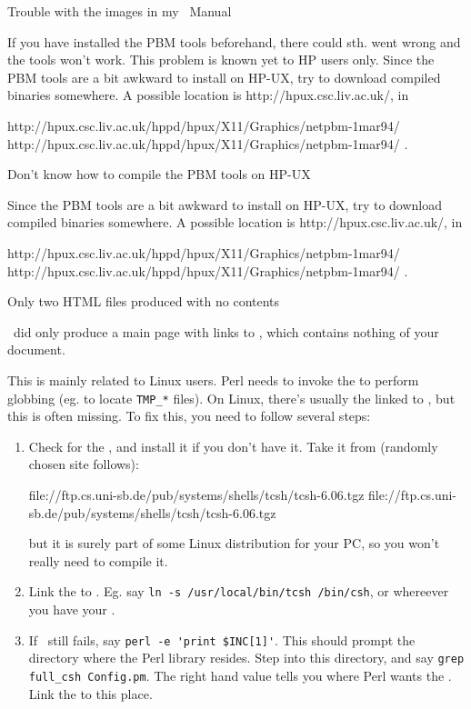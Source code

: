 \begin{htmllist}
\item [Trouble with the images in my \latextohtml\ Manual]

If you have installed the PBM tools beforehand, there could sth.
went wrong and the tools won't work.
This problem is known yet to HP users only.
Since the PBM tools are a bit awkward to install on HP-UX, try
to download compiled binaries somewhere.
A possible location is http://hpux.csc.liv.ac.uk/, in

\htmladdnormallink
{http://hpux.csc.liv.ac.uk/hppd/hpux/X11/Graphics/netpbm-1mar94/}
{http://hpux.csc.liv.ac.uk/hppd/hpux/X11/Graphics/netpbm-1mar94/}
.


\item [Don't know how to compile the PBM tools on HP-UX]

Since the PBM tools are a bit awkward to install on HP-UX, try
to download compiled binaries somewhere.
A possible location is http://hpux.csc.liv.ac.uk/, in

\htmladdnormallink
{http://hpux.csc.liv.ac.uk/hppd/hpux/X11/Graphics/netpbm-1mar94/}
{http://hpux.csc.liv.ac.uk/hppd/hpux/X11/Graphics/netpbm-1mar94/}
.


\item [Only two HTML files produced with no contents]

\latextohtml\ did only produce a main page with links to
, which contains nothing of your document.

This is mainly related to Linux users.
Perl needs to invoke the  to perform globbing
(eg. to locate \verb/TMP_*/ files).
On Linux, there's usually the  linked to ,
but this is often missing.
To fix this, you need to follow several steps:

\begin{enumerate}
\item Check for the , and install it if you don't have it.
Take it from (randomly chosen site follows):

\htmladdnormallink
{file://ftp.cs.uni-sb.de/pub/systems/shells/tcsh/tcsh-6.06.tgz}
{file://ftp.cs.uni-sb.de/pub/systems/shells/tcsh/tcsh-6.06.tgz}


but it is surely part of some Linux distribution for your PC,
so you won't really need to compile it.

\item Link the  to .
Eg. say \verb|ln -s /usr/local/bin/tcsh /bin/csh|, or whereever
you have your .

\item If \latextohtml\ still fails, say \verb/perl -e 'print $INC[1]'/.
This should prompt the directory where the Perl library resides.
Step into this directory, and say \verb/grep full_csh Config.pm/.
The right hand value tells you where Perl wants the .
Link the  to this place.
\end{enumerate}



\end{htmllist}
